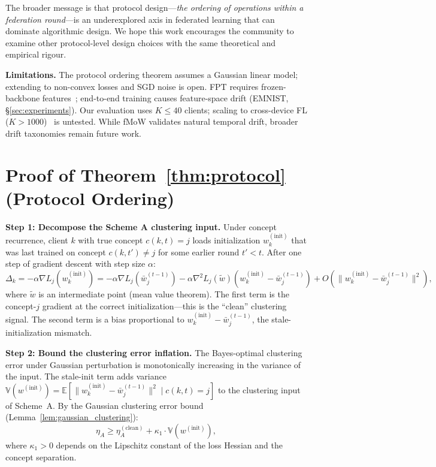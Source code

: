 \documentclass[11pt]{article}
\newcommand{\E}{\mathbb{E}}
\newcommand{\V}{\mathbb{V}}
\newcommand{\wbar}{\bar{w}}
\begin{document}
The broader message is that protocol design---\emph{the ordering of operations within a federation round}---is an underexplored axis in federated learning that can dominate algorithmic design.
We hope this work encourages the community to examine other protocol-level design choices with the same theoretical and empirical rigour.

\textbf{Limitations.}
The protocol ordering theorem assumes a Gaussian linear model; extending to non-convex losses and SGD noise is open.
FPT requires frozen-backbone features~\citep{chen2022on}; end-to-end training causes feature-space drift (EMNIST, \S\ref{sec:experiments}).
Our evaluation uses $K \le 40$ clients; scaling to cross-device FL ($K > 1000$)~\citep{kairouz2021advances} is untested.
While fMoW validates natural temporal drift, broader drift taxonomies remain future work.




\newpage
\appendix

\section{Proof of Theorem~\ref{thm:protocol} (Protocol Ordering)}
\label{app:proof_protocol}

\textbf{Step 1: Decompose the Scheme A clustering input.}
Under concept recurrence, client $k$ with true concept $c(k,t) = j$ loads initialization $w_k^{(\mathrm{init})}$ that was last trained on concept $c(k, t') \ne j$ for some earlier round $t' < t$.
After one step of gradient descent with step size $\alpha$:
\begin{equation}
\Delta_k = -\alpha \nabla L_j(w_k^{(\mathrm{init})}) = -\alpha \nabla L_j(\wbar_j^{(t-1)}) - \alpha \nabla^2 L_j(\tilde w)(w_k^{(\mathrm{init})} - \wbar_j^{(t-1)}) + O(\|w_k^{(\mathrm{init})} - \wbar_j^{(t-1)}\|^2),
\end{equation}
where $\tilde w$ is an intermediate point (mean value theorem).
The first term is the concept-$j$ gradient at the correct initialization---this is the ``clean'' clustering signal.
The second term is a bias proportional to $w_k^{(\mathrm{init})} - \wbar_j^{(t-1)}$, the stale-initialization mismatch.

\textbf{Step 2: Bound the clustering error inflation.}
The Bayes-optimal clustering error under Gaussian perturbation is monotonically increasing in the variance of the input.
The stale-init term adds variance $\V(w^{(\mathrm{init})}) = \E[\|w_k^{(\mathrm{init})} - \wbar_j^{(t-1)}\|^2 \mid c(k,t) = j]$ to the clustering input of Scheme~A.
By the Gaussian clustering error bound (Lemma~\ref{lem:gaussian_clustering}):
\begin{equation}
\eta_A \ge \eta_A^{(\mathrm{clean})} + \kappa_1 \cdot \V(w^{(\mathrm{init})}),
\end{equation}
where $\kappa_1 > 0$ depends on the Lipschitz constant of the loss Hessian and the concept separation.
\end{document}
